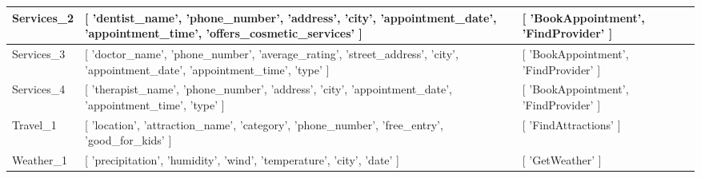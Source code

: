\begin{tabularx}{\linewidth}{|l|L|L|}
    Services\_2 & [ 'dentist\_name', 'phone\_number', 'address', 'city', 'appointment\_date', 'appointment\_time', 'offers\_cosmetic\_services' ] & [ 'BookAppointment', 'FindProvider' ] \\ \hline
    Services\_3 & [ 'doctor\_name', 'phone\_number', 'average\_rating', 'street\_address', 'city', 'appointment\_date', 'appointment\_time', 'type' ] & [ 'BookAppointment', 'FindProvider' ] \\ \hline
    Services\_4 & [ 'therapist\_name', 'phone\_number', 'address', 'city', 'appointment\_date', 'appointment\_time', 'type' ] & [ 'BookAppointment', 'FindProvider' ] \\ \hline
    Travel\_1 & [ 'location', 'attraction\_name', 'category', 'phone\_number', 'free\_entry', 'good\_for\_kids' ] & [ 'FindAttractions' ] \\ \hline
    Weather\_1 & [ 'precipitation', 'humidity', 'wind', 'temperature', 'city', 'date' ] & [ 'GetWeather' ] \\
\end{tabularx}